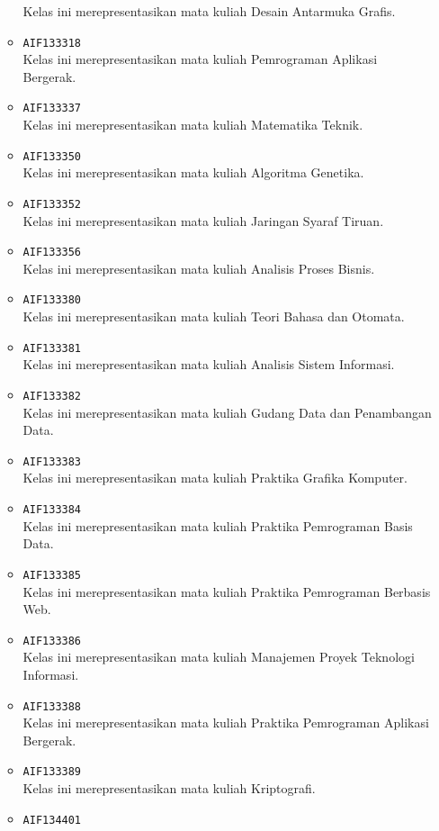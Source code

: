 \begin{enumerate}
\begin{itemize}
Kelas ini merepresentasikan mata kuliah Desain Antarmuka Grafis.
\item \texttt{AIF133318} \\
Kelas ini merepresentasikan mata kuliah Pemrograman Aplikasi Bergerak.
\item \texttt{AIF133337} \\
Kelas ini merepresentasikan mata kuliah Matematika Teknik.
\item \texttt{AIF133350} \\
Kelas ini merepresentasikan mata kuliah Algoritma Genetika.
\item \texttt{AIF133352} \\
Kelas ini merepresentasikan mata kuliah Jaringan Syaraf Tiruan.
\item \texttt{AIF133356} \\
Kelas ini merepresentasikan mata kuliah Analisis Proses Bisnis.
\item \texttt{AIF133380} \\
Kelas ini merepresentasikan mata kuliah Teori Bahasa dan Otomata.
\item \texttt{AIF133381} \\
Kelas ini merepresentasikan mata kuliah Analisis Sistem Informasi.
\item \texttt{AIF133382} \\
Kelas ini merepresentasikan mata kuliah Gudang Data dan Penambangan Data.
\item \texttt{AIF133383} \\
Kelas ini merepresentasikan mata kuliah Praktika Grafika Komputer.
\item \texttt{AIF133384} \\
Kelas ini merepresentasikan mata kuliah Praktika Pemrograman Basis Data.
\item \texttt{AIF133385} \\
Kelas ini merepresentasikan mata kuliah Praktika Pemrograman Berbasis Web.
\item \texttt{AIF133386} \\
Kelas ini merepresentasikan mata kuliah Manajemen Proyek Teknologi Informasi.
\item \texttt{AIF133388} \\
Kelas ini merepresentasikan mata kuliah Praktika Pemrograman Aplikasi Bergerak.
\item \texttt{AIF133389} \\
Kelas ini merepresentasikan mata kuliah Kriptografi.
\item \texttt{AIF134401} \\

\end{itemize}
\end{enumerate}
